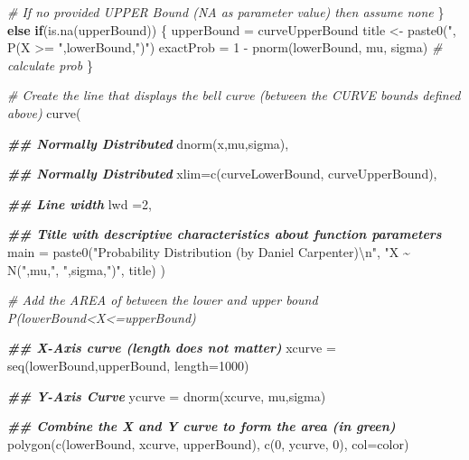 \documentclass[
  12pt,
]{article}
\newenvironment{Shaded}{\begin{snugshade}}{\end{snugshade}}
\newcommand{\AttributeTok}[1]{\textcolor[rgb]{0.77,0.63,0.00}{#1}}
\newcommand{\CommentTok}[1]{\textcolor[rgb]{0.56,0.35,0.01}{\textit{#1}}}
\newcommand{\ControlFlowTok}[1]{\textcolor[rgb]{0.13,0.29,0.53}{\textbf{#1}}}
\newcommand{\DecValTok}[1]{\textcolor[rgb]{0.00,0.00,0.81}{#1}}
\newcommand{\DocumentationTok}[1]{\textcolor[rgb]{0.56,0.35,0.01}{\textbf{\textit{#1}}}}
\newcommand{\FunctionTok}[1]{\textcolor[rgb]{0.00,0.00,0.00}{#1}}
\newcommand{\NormalTok}[1]{#1}
\newcommand{\OtherTok}[1]{\textcolor[rgb]{0.56,0.35,0.01}{#1}}
\newcommand{\SpecialCharTok}[1]{\textcolor[rgb]{0.00,0.00,0.00}{#1}}
\newcommand{\StringTok}[1]{\textcolor[rgb]{0.31,0.60,0.02}{#1}}
\begin{document}
\begin{Shaded}
\begin{Highlighting}[]
      \CommentTok{\# If no provided UPPER Bound (NA as parameter value) then assume none}
\NormalTok{      \} }\ControlFlowTok{else} \ControlFlowTok{if}\NormalTok{(}\FunctionTok{is.na}\NormalTok{(upperBound)) \{}
\NormalTok{        upperBound }\OtherTok{=}\NormalTok{ curveUpperBound}
\NormalTok{        title }\OtherTok{\textless{}{-}} \FunctionTok{paste0}\NormalTok{(}\StringTok{", P(X \textgreater{}= "}\NormalTok{,lowerBound,}\StringTok{")"}\NormalTok{)}
\NormalTok{        exactProb }\OtherTok{=} \DecValTok{1} \SpecialCharTok{{-}} \FunctionTok{pnorm}\NormalTok{(lowerBound, mu, sigma) }\CommentTok{\# calculate prob }
\NormalTok{      \}}
      
      \CommentTok{\# Create the line that displays the bell curve (between the CURVE bounds defined above)}
      \FunctionTok{curve}\NormalTok{(}
        
        \DocumentationTok{\#\# Normally Distributed}
        \FunctionTok{dnorm}\NormalTok{(x,mu,sigma), }
        
        \DocumentationTok{\#\# Normally Distributed}
        \AttributeTok{xlim=}\FunctionTok{c}\NormalTok{(curveLowerBound, curveUpperBound), }
        
        \DocumentationTok{\#\# Line width}
        \AttributeTok{lwd =}\DecValTok{2}\NormalTok{, }
        
        \DocumentationTok{\#\# Title with descriptive characteristics about function parameters}
        \AttributeTok{main =} \FunctionTok{paste0}\NormalTok{(}\StringTok{"Probability Distribution (by Daniel Carpenter)}\SpecialCharTok{\textbackslash{}n}\StringTok{"}\NormalTok{,}
                      \StringTok{"X \textasciitilde{} N("}\NormalTok{,mu,}\StringTok{", "}\NormalTok{,sigma,}\StringTok{")"}\NormalTok{, title)}
\NormalTok{      )}
      
      \CommentTok{\# Add the AREA of between the lower and upper bound P(lowerBound\textless{}X\textless{}=upperBound)}
      
        \DocumentationTok{\#\# X{-}Axis curve (length does not matter)}
\NormalTok{        xcurve }\OtherTok{=} \FunctionTok{seq}\NormalTok{(lowerBound,upperBound, }\AttributeTok{length=}\DecValTok{1000}\NormalTok{)}
        
        \DocumentationTok{\#\# Y{-}Axis Curve}
\NormalTok{        ycurve }\OtherTok{=} \FunctionTok{dnorm}\NormalTok{(xcurve, mu,sigma)}
        
        \DocumentationTok{\#\# Combine the X and Y curve to form the area (in green)}
        \FunctionTok{polygon}\NormalTok{(}\FunctionTok{c}\NormalTok{(lowerBound, xcurve, upperBound), }
                \FunctionTok{c}\NormalTok{(}\DecValTok{0}\NormalTok{, ycurve, }\DecValTok{0}\NormalTok{), }
                \AttributeTok{col=}\NormalTok{color) }
      

\end{Highlighting}
\end{Shaded}
\end{document}
